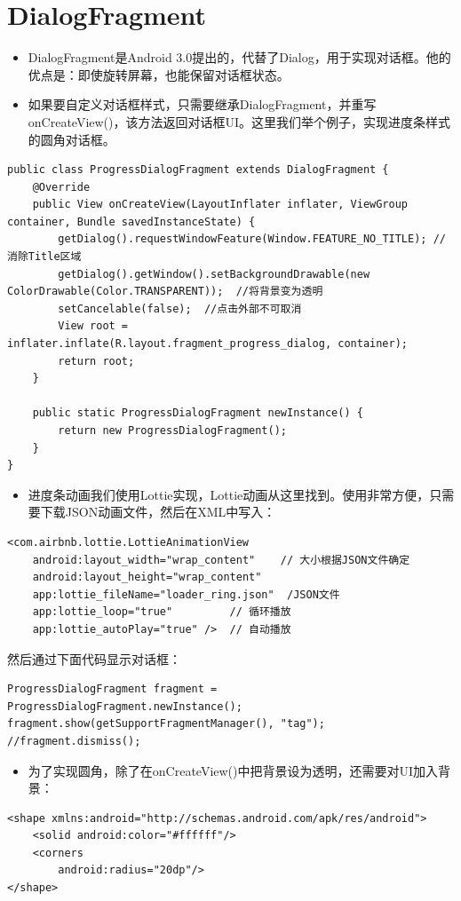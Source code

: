 \documentclass[9pt, b5paaper]{book}
\begin{document}
\section{DialogFragment}
\label{sec-3-7}
\begin{itemize}
\item DialogFragment是Android 3.0提出的，代替了Dialog，用于实现对话框。他的优点是：即使旋转屏幕，也能保留对话框状态。
\item 如果要自定义对话框样式，只需要继承DialogFragment，并重写onCreateView()，该方法返回对话框UI。这里我们举个例子，实现进度条样式的圆角对话框。
\end{itemize}
\begin{verbatim}
public class ProgressDialogFragment extends DialogFragment {
    @Override
    public View onCreateView(LayoutInflater inflater, ViewGroup container, Bundle savedInstanceState) {
        getDialog().requestWindowFeature(Window.FEATURE_NO_TITLE); //消除Title区域
        getDialog().getWindow().setBackgroundDrawable(new ColorDrawable(Color.TRANSPARENT));  //将背景变为透明
        setCancelable(false);  //点击外部不可取消
        View root = inflater.inflate(R.layout.fragment_progress_dialog, container);
        return root;
    }

    public static ProgressDialogFragment newInstance() {
        return new ProgressDialogFragment();
    }
}
\end{verbatim}
\begin{itemize}
\item 进度条动画我们使用Lottie实现，Lottie动画从这里找到。使用非常方便，只需要下载JSON动画文件，然后在XML中写入：
\end{itemize}
\begin{verbatim}
<com.airbnb.lottie.LottieAnimationView
    android:layout_width="wrap_content"    // 大小根据JSON文件确定
    android:layout_height="wrap_content"
    app:lottie_fileName="loader_ring.json"  /JSON文件
    app:lottie_loop="true"         // 循环播放
    app:lottie_autoPlay="true" />  // 自动播放
\end{verbatim}
然后通过下面代码显示对话框：
\begin{verbatim}
ProgressDialogFragment fragment = ProgressDialogFragment.newInstance();
fragment.show(getSupportFragmentManager(), "tag");
//fragment.dismiss();
\end{verbatim}
\begin{itemize}
\item 为了实现圆角，除了在onCreateView()中把背景设为透明，还需要对UI加入背景：
\end{itemize}
\begin{verbatim}
<shape xmlns:android="http://schemas.android.com/apk/res/android">
    <solid android:color="#ffffff"/>
    <corners
        android:radius="20dp"/>
</shape>
\end{verbatim}
\end{document}
